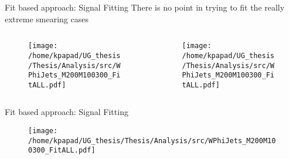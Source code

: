 \documentclass[bigger]{beamer}
\begin{document}
\begin{frame}[label={sec:org0c06964}]{Fit based approach: Signal Fitting}
There is no point in trying to fit the really extreme smearing cases
\begin{columns}
\begin{column}{0.5\columnwidth}
\begin{figure}[h]
\centering
\texttt{[image: /home/kpapad/UG\_thesis/Thesis/Analysis/src/WPhiJets\_M200M100300\_FitALL.pdf]}
\end{figure}
\end{column}

\begin{column}{0.5\columnwidth}
\begin{figure}[h]
\centering
\texttt{[image: /home/kpapad/UG\_thesis/Thesis/Analysis/src/WPhiJets\_M200M100300\_FitALL.pdf]}
\end{figure}
\end{column}
\end{columns}
\end{frame}

\begin{frame}[label={sec:orgd671782}]{Fit based approach: Signal Fitting}
\begin{figure}[h]
\centering
\texttt{[image: /home/kpapad/UG\_thesis/Thesis/Analysis/src/WPhiJets\_M200M100300\_FitALL.pdf]}
\end{figure}
\end{frame}
\end{document}
